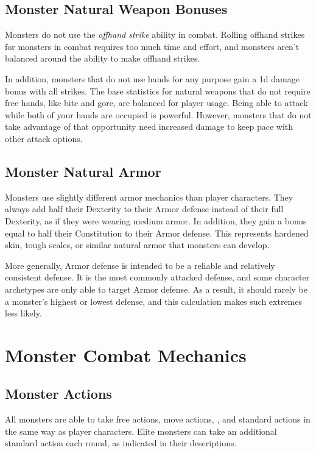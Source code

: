     \subsection{Monster Natural Weapon Bonuses}\label{Monster Natural Weapon Bonuses}
        Monsters do not use the \textit{offhand strike} ability in combat.
        Rolling offhand strikes for monsters in combat requires too much time and effort, and monsters aren't balanced around the ability to make offhand strikes.

        In addition, monsters that do not use hands for any purpose gain a \plus1d damage bonus with all strikes.
        The base statistics for natural weapons that do not require free hands, like bite and gore, are balanced for player usage.
        Being able to attack while both of your hands are occupied is powerful.
        However, monsters that do not take advantage of that opportunity need increased damage to keep pace with other attack options.

    \subsection{Monster Natural Armor}\label{Monster Natural Armor}
        Monsters use slightly different armor mechanics than player characters.
        They always add half their Dexterity to their Armor defense instead of their full Dexterity, as if they were wearing medium armor.
        In addition, they gain a bonus equal to half their Constitution to their Armor defense.
        This represents hardened skin, tough scales, or similar natural armor that monsters can develop.

        More generally, Armor defense is intended to be a reliable and relatively consistent defense.
        It is the most commonly attacked defense, and some character archetypes are only able to target Armor defense.
        As a result, it should rarely be a monster's highest or lowest defense, and this calculation makes such extremes less likely.

\section{Monster Combat Mechanics}

    \subsection{Monster Actions}\label{Monster Actions}
        All monsters are able to take free actions, move actions, , and standard actions in the same way as player characters.
        Elite monsters can take an additional standard action each round, as indicated in their descriptions.

